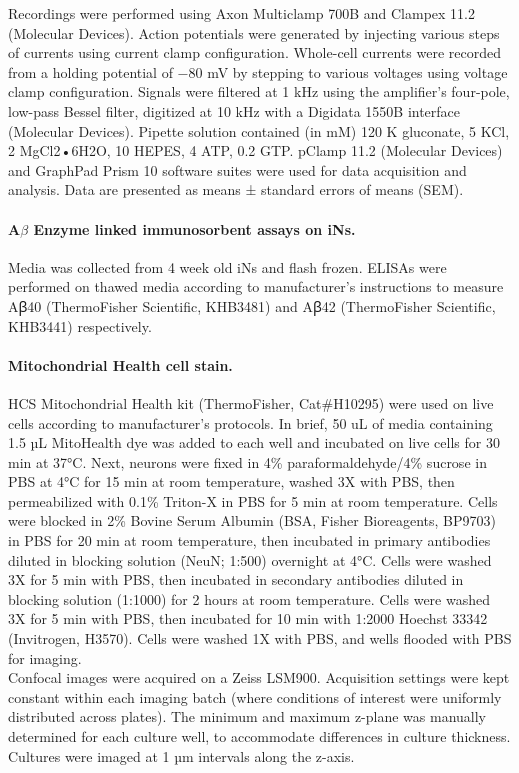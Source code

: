 Recordings were performed using Axon Multiclamp 700B and Clampex 11.2 (Molecular Devices). Action potentials were generated by injecting various steps of currents using current clamp configuration.  Whole-cell currents were recorded from a holding potential of −80 mV by stepping to various voltages using voltage clamp configuration. Signals were filtered at 1 kHz using the amplifier’s four-pole, low-pass Bessel filter, digitized at 10 kHz with a Digidata 1550B interface (Molecular Devices). Pipette solution contained (in mM) 120 K gluconate, 5 KCl, 2 MgCl2•6H2O, 10 HEPES, 4 ATP, 0.2 GTP. pClamp 11.2 (Molecular Devices) and GraphPad Prism 10 software suites were used for data acquisition and analysis. Data are presented as means ± standard errors of means (SEM).

\paragraph{A$\beta$ Enzyme linked immunosorbent assays on iNs.}
Media was collected from 4 week old iNs and flash frozen. ELISAs were performed on thawed media according to manufacturer’s instructions to measure Aꞵ40 (ThermoFisher Scientific, KHB3481) and Aꞵ42 (ThermoFisher Scientific, KHB3441) respectively.

\paragraph{Mitochondrial Health cell stain.}
HCS Mitochondrial Health kit (ThermoFisher, Cat\#H10295) were used on live cells according to manufacturer’s protocols. In brief, 50 uL of media containing 1.5 µL MitoHealth dye was added to each well and incubated on live cells for 30 min at 37°C. Next, neurons were fixed in 4\% paraformaldehyde/4\% sucrose in PBS at 4°C for 15 min at room temperature, washed 3X with PBS, then permeabilized with 0.1\% Triton-X in PBS for 5 min at room temperature. Cells were blocked in 2\% Bovine Serum Albumin (BSA, Fisher Bioreagents, BP9703) in PBS for 20 min at room temperature, then incubated in primary antibodies diluted in blocking solution (NeuN; 1:500) overnight at 4°C. Cells were washed 3X for 5 min with PBS, then incubated in secondary antibodies diluted in blocking solution (1:1000) for 2 hours at room temperature. Cells were washed 3X for 5 min with PBS, then incubated for 10 min with 1:2000 Hoechst 33342 (Invitrogen, H3570). Cells were washed 1X with PBS, and wells flooded with PBS for imaging.\\
Confocal images were acquired on a Zeiss LSM900. Acquisition settings were kept constant within each imaging batch (where conditions of interest were uniformly distributed across plates). The minimum and maximum z-plane was manually determined for each culture well, to accommodate differences in culture thickness. Cultures were imaged at 1 µm intervals along the z-axis.

